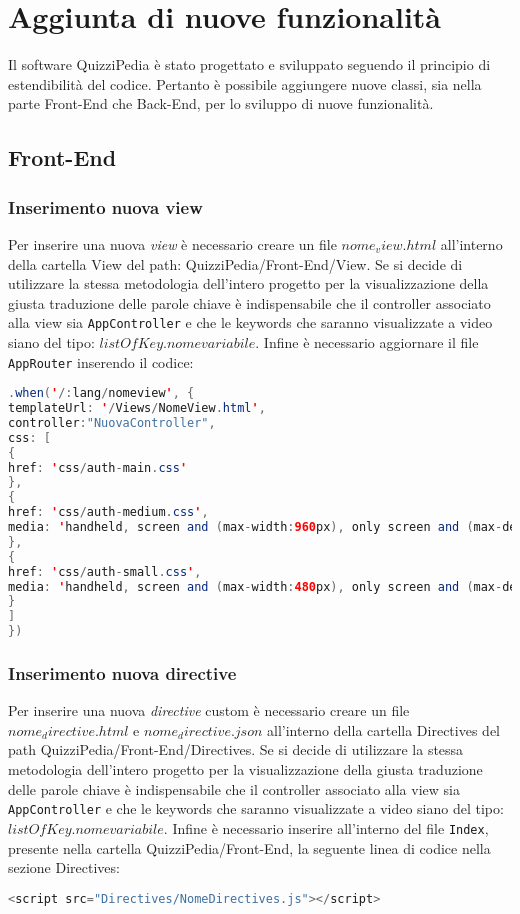 \newpage
\section{Aggiunta di nuove funzionalità}
Il software QuizziPedia è stato progettato e sviluppato seguendo il principio di estendibilità del codice. Pertanto è possibile aggiungere nuove classi, sia nella parte Front-End che Back-End, per lo sviluppo di nuove funzionalità.

\subsection{Front-End}

\subsubsection{Inserimento nuova view}
Per inserire una nuova \textit{view} è necessario creare un file $nome_view.html$ all'interno della cartella View del path: QuizziPedia/Front-End/View. Se si decide di utilizzare la stessa metodologia dell'intero progetto per la visualizzazione della giusta traduzione delle parole chiave è indispensabile che il controller associato alla view sia \texttt{AppController} e che le keywords che saranno visualizzate a video siano del tipo: \texttt{$listOfKey.nomevariabile$}. Infine è necessario aggiornare il file \texttt{AppRouter} inserendo il codice:

\begin{lstlisting}[language=Java,firstnumber=1]
.when('/:lang/nomeview', {
templateUrl: '/Views/NomeView.html',
controller:"NuovaController",
css: [
{
href: 'css/auth-main.css'
},
{
href: 'css/auth-medium.css',
media: 'handheld, screen and (max-width:960px), only screen and (max-device-width:960px)'
},
{
href: 'css/auth-small.css',
media: 'handheld, screen and (max-width:480px), only screen and (max-device-width:480px)'
}
]
})
\end{lstlisting}

\subsubsection{Inserimento nuova directive}
Per inserire una nuova \textit{directive} custom è necessario creare un file $nome_directive.html$ e $nome_directive.json$ all'interno della cartella Directives del path QuizziPedia/Front-End/Directives. Se si decide di utilizzare la stessa metodologia dell'intero progetto per la visualizzazione della giusta traduzione delle parole chiave è indispensabile che il controller associato alla view sia \texttt{AppController} e che le keywords che saranno visualizzate a video siano del tipo: \texttt{$listOfKey.nomevariabile$}. Infine è necessario inserire all'interno del file \texttt{Index}, presente nella cartella QuizziPedia/Front-End, la seguente linea di codice nella sezione Directives:
\begin{lstlisting}[language=Java,firstnumber=1]
<script src="Directives/NomeDirectives.js"></script>
\end{lstlisting}


